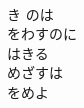\documentclass[10pt,b5j]{tarticle} %
\begin{document}
\begin{enumerate}
\begin{minipage}[c]{\blocksize}
    \end{minipage}
    \begin{minipage}[c]{\blocksize}
        
        \vspace{\linespace}
        \item~\\
        き のは\\
        をわすのに\\
        はきる\\
        めざすは\\
        をめよ
    
    \end{minipage}
\end{enumerate} %
\end{document}
